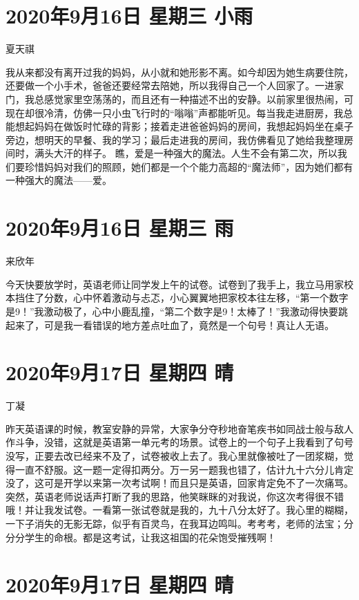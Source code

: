 \section{2020年9月16日 星期三 小雨}

夏天祺

我从来都没有离开过我的妈妈，从小就和她形影不离。如今却因为她生病要住院，还要做一个小手术，爸爸还要经常去陪她，所以我得自己一个人回家了。一进家门，我总感觉家里空荡荡的，而且还有一种描述不出的安静。以前家里很热闹，可现在却很冷清，仿佛一只小虫飞行时的“嗡嗡”声都能听见。每当我走进厨房，我总能想起妈妈在做饭时忙碌的背影；接着走进爸爸妈妈的房间，我想起妈妈坐在桌子旁边，想明天的早餐、我的学习；最后走进我的房间，我仿佛看见了她给我整理房间时，满头大汗的样子。
瞧，爱是一种强大的魔法。人生不会有第二次，所以我们要珍惜妈妈对我们的照顾，她们都是一个个能力高超的“魔法师”，因为她们都有一种强大的魔法——爱。

\section{2020年9月16日 星期三 雨}

来欣年

今天快要放学时，英语老师让同学发上午的试卷。试卷到了我手上，我立马用家校本挡住了分数，心中怀着激动与忐忑，小心翼翼地把家校本往左移，“第一个数字是9！”我激动极了，心中小鹿乱撞，“第二个数字是9！太棒了！”我激动得快要跳起来了，可是我一看错误的地方差点吐血了，竟然是一个句号！真让人无语。

\section{2020年9月17日 星期四 晴}

丁凝

昨天英语课的时候，教室安静的异常，大家争分夺秒地奋笔疾书如同战士般与敌人作斗争，没错，这就是英语第一单元考的场景。试卷上的一个句子上我看到了句号没写，正要去改已经来不及了，试卷被收上去了。我心里就像被吐了一团浆糊，觉得一直不舒服。这一题一定得扣两分。万一另一题我也错了，估计九十六分儿肯定没了，这可是开学以来第一次考试啊！而且只是英语，回家肯定免不了一次痛骂。突然，英语老师说话声打断了我的思路，他笑眯眯的对我说，你这次考得很不错哦！并让我发试卷。一看第一张试卷就是我的，九十八分太好了。我心里的糊糊，一下子消失的无影无踪，似乎有百灵鸟，在我耳边鸣叫。考考考，老师的法宝；分分分学生的命根。都是这考试，让我这祖国的花朵饱受摧残啊！

\section{2020年9月17日 星期四 晴}

